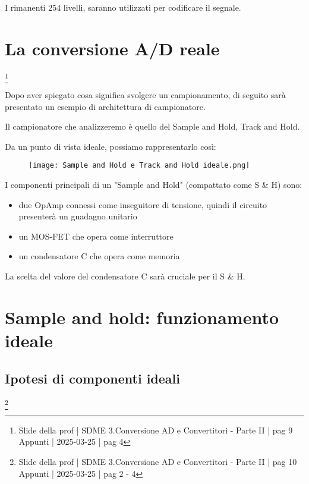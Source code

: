 I rimanenti 254 livelli, saranno utilizzati per codificare il segnale. \newline 

\newpage 

\section{La conversione A/D reale}
\footnote{Slide della prof | SDME 3.Conversione AD e Convertitori - Parte II | pag 9 \\  
Appunti | 2025-03-25 | pag 4} 

Dopo aver spiegato cosa significa svolgere un campionamento, 
di seguito sarà presentato un esempio di architettura di campionatore. \newline 

Il campionatore che analizzeremo è quello del Sample and Hold, Track and Hold. \newline 

Da un punto di vista ideale, possiamo rappresentarlo così: 

\begin{figure}[h]
    \centering
    \texttt{[image: Sample and Hold e Track and Hold ideale.png]}
\end{figure}

I componenti principali di un "Sample and Hold" (compattato come S \& H) sono: 

\begin{itemize}
    \item due OpAmp connessi come inseguitore di tensione, quindi il circuito presenterà un guadagno unitario 
    \item un MOS-FET che opera come interruttore 
    \item un condensatore C che opera come memoria 
\end{itemize}

La scelta del valore del condensatore C sarà cruciale per il S \& H. \newline 

\newpage 

\section{Sample and hold: funzionamento ideale}

\subsection{Ipotesi di componenti ideali} 
\footnote{Slide della prof | SDME 3.Conversione AD e Convertitori - Parte II | pag 10 \\  
Appunti | 2025-03-25 | pag 2 - 4} 

